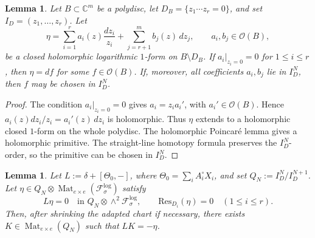 \documentclass[11pt]{amsart}
\theoremstyle{plain}
\newtheorem{lemma}[theorem]{Lemma}
\theoremstyle{definition}
\DeclareMathOperator{\Mat}{Mat}
\newcommand{\fol}{\mathcal{F}}
\theoremstyle{definition}
\newcommand{\C}{\mathbb{C}}
\newcommand{\OO}{\mathcal{O}}
\newcommand{\Res}{\mathrm{Res}}
\begin{document}
\begin{lemma}\label{lem:holomorphic-residue-free-primitive}
Let $B\subset\C^m$ be a polydisc, let $D_B=\{z_1\cdots z_r=0\}$, and set
$I_D=(z_1,\ldots,z_r)$.  Let
\[
        \eta
        =
        \sum_{i=1}^r a_i(z)\frac{dz_i}{z_i}
        +
        \sum_{j=r+1}^m b_j(z)\,dz_j,
        \qquad
        a_i,b_j\in\OO(B),
\]
be a closed holomorphic logarithmic $1$-form on $B\setminus D_B$.  If
$a_i|_{z_i=0}=0$ for $1\le i\le r$, then $\eta=df$ for some $f\in\OO(B)$.
If, moreover, all coefficients $a_i,b_j$ lie in $I_D^N$, then $f$ may be
chosen in $I_D^N$.
\end{lemma}

\begin{proof}
The condition $a_i|_{z_i=0}=0$ gives $a_i=z_i a_i'$, with $a_i'\in\OO(B)$.
Hence $a_i(z)dz_i/z_i=a_i'(z)\,dz_i$ is holomorphic.  Thus $\eta$ extends to a
holomorphic closed $1$-form on the whole polydisc.  The holomorphic
Poincar\'e lemma gives a holomorphic primitive.  The straight-line homotopy
formula preserves the $I_D^N$-order, so the primitive can be chosen in
$I_D^N$.
\end{proof}

\begin{lemma}\label{lem:residue-free-EP-acyclicity}
Let $L:=\delta+[\Theta_0,-]$, where $\Theta_0=\sum_iA_i^\circ X_i$, and set
$Q_N:=I_D^N/I_D^{N+1}$.  Let
$\eta\in Q_N\otimes\Mat_{e\times e}(\fol_\sigma^{\log})$ satisfy
\[
        L\eta=0
        \quad\text{in }Q_N\otimes\wedge^2\fol_\sigma^{\log},
        \qquad
        \Res_{D_i}(\eta)=0
        \quad(1\le i\le r).
\]
Then, after shrinking the adapted chart if necessary, there exists
$K\in\Mat_{e\times e}(Q_N)$ such that $LK=-\eta$.
\end{lemma}
\end{document}
